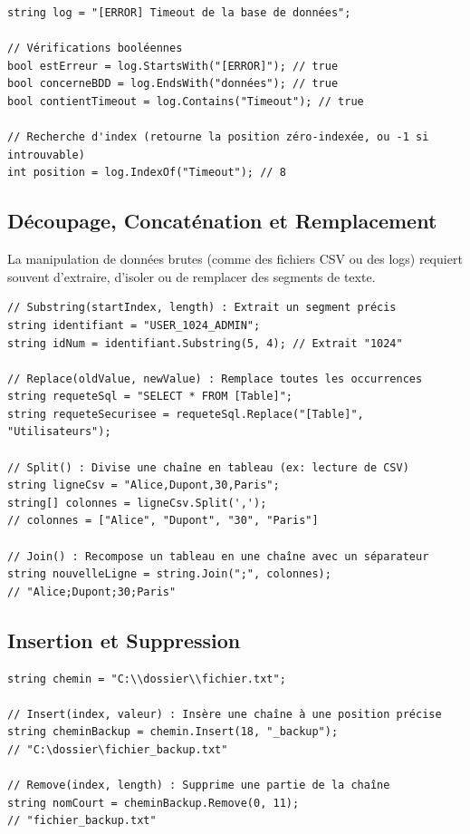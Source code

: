 \begin{lstlisting}[style=csharpstyle]
string log = "[ERROR] Timeout de la base de données";

// Vérifications booléennes
bool estErreur = log.StartsWith("[ERROR]"); // true
bool concerneBDD = log.EndsWith("données"); // true
bool contientTimeout = log.Contains("Timeout"); // true

// Recherche d'index (retourne la position zéro-indexée, ou -1 si introuvable)
int position = log.IndexOf("Timeout"); // 8
\end{lstlisting}

\subsection{Découpage, Concaténation et Remplacement}

La manipulation de données brutes (comme des fichiers CSV ou des logs) requiert souvent d'extraire, d'isoler ou de remplacer des segments de texte.

\begin{lstlisting}[style=csharpstyle]
// Substring(startIndex, length) : Extrait un segment précis
string identifiant = "USER_1024_ADMIN";
string idNum = identifiant.Substring(5, 4); // Extrait "1024"

// Replace(oldValue, newValue) : Remplace toutes les occurrences
string requeteSql = "SELECT * FROM [Table]";
string requeteSecurisee = requeteSql.Replace("[Table]", "Utilisateurs");

// Split() : Divise une chaîne en tableau (ex: lecture de CSV)
string ligneCsv = "Alice,Dupont,30,Paris";
string[] colonnes = ligneCsv.Split(','); 
// colonnes = ["Alice", "Dupont", "30", "Paris"]

// Join() : Recompose un tableau en une chaîne avec un séparateur
string nouvelleLigne = string.Join(";", colonnes); 
// "Alice;Dupont;30;Paris"
\end{lstlisting}

\subsection{Insertion et Suppression}

\begin{lstlisting}[style=csharpstyle]
string chemin = "C:\\dossier\\fichier.txt";

// Insert(index, valeur) : Insère une chaîne à une position précise
string cheminBackup = chemin.Insert(18, "_backup"); 
// "C:\dossier\fichier_backup.txt"

// Remove(index, length) : Supprime une partie de la chaîne
string nomCourt = cheminBackup.Remove(0, 11); 
// "fichier_backup.txt"
\end{lstlisting}

